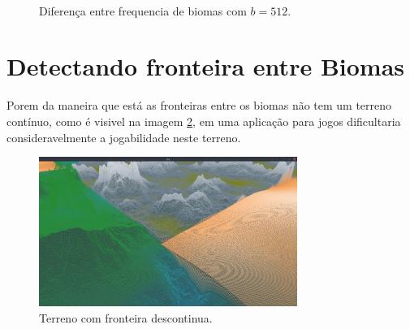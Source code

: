 \begin{figure}[H]
     \centering
     \hspace{0.1cm}
     \\
     \caption{Diferença entre frequencia de biomas com $b = 512$.}
     
     \label{fig:biomeareasanotherCompx}
\end{figure}

\section{Detectando fronteira entre Biomas}

Porem da maneira que está as fronteiras entre os biomas não tem um terreno
contínuo, como é visivel na imagem \ref{fig:descontinuos}, em uma aplicação para jogos
dificultaria consideravelmente
a jogabilidade neste terreno. %

\begin{figure}[H]
    \centering
    \includegraphics[width=0.75\textwidth]{figuras/descontinuos.png}
    \caption{Terreno com fronteira descontinua.}
    \label{fig:descontinuos}
\end{figure}

